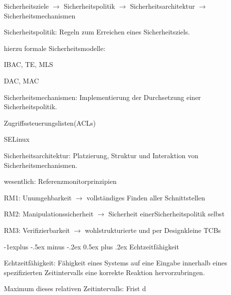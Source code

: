 \documentclass[a4paper]{article}
\makeatletter
\renewcommand{\subsection}{\@startsection{subsection}{2}{0mm}%
 {-1explus -.5ex minus -.2ex}%
 {0.5ex plus .2ex}%
 {\normalfont\normalsize\bfseries}}
\makeatother
\begin{document}
\begin{multicols}{3}
    \begin{itemize*}
        \item
        Sicherheitsziele $\rightarrow$ Sicherheitspolitik
        $\rightarrow$ Sicherheitsarchitektur
        $\rightarrow$ Sicherheitsmechanismen
        \item
        Sicherheitspolitik: Regeln zum Erreichen eines Sicherheitsziels.
        \begin{itemize*}
            \item hierzu formale Sicherheitsmodelle:
            \item IBAC, TE, MLS
            \item DAC, MAC
        \end{itemize*}
        \item
        Sicherheitsmechanismen: Implementierung der Durchsetzung einer
        Sicherheitspolitik.
        \begin{itemize*}
            \item Zugriffssteuerungslisten(ACLs)
            \item SELinux
        \end{itemize*}
        \item
        Sicherheitsarchitektur: Platzierung, Struktur und Interaktion von
        Sicherheitsmechanismen.
        \begin{itemize*}
            \item wesentlich: Referenzmonitorprinzipien
            \item RM1: Unumgehbarkeit $\rightarrow$ vollständiges Finden aller Schnittstellen
            \item RM2: Manipulationssicherheit $\rightarrow$ Sicherheit einerSicherheitspolitik selbst
            \item RM3: Verifizierbarkeit $\rightarrow$ wohlstrukturierte und per Designkleine TCBs
        \end{itemize*}
    \end{itemize*}


    \subsection{Echtzeitfähigkeit}

    \begin{itemize*}
        \item
        Echtzeitfähigkeit: Fähigkeit eines Systems auf eine Eingabe innerhalb
        eines spezifizierten Zeitintervalls eine korrekte Reaktion
        hervorzubringen.
        \item
        Maximum dieses relativen Zeitintervalls: Frist d
    \end{itemize*}


\end{multicols}
\end{document}
